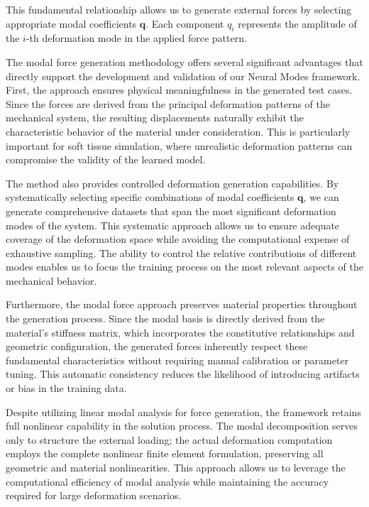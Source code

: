 This fundamental relationship allows us to generate external forces by selecting appropriate modal coefficients $\bm{q}$. Each component $q_i$ represents the amplitude of the $i$-th deformation mode in the applied force pattern.


The modal force generation methodology offers several significant advantages that directly support the development and validation of our Neural Modes framework. First, the approach ensures physical meaningfulness in the generated test cases. Since the forces are derived from the principal deformation patterns of the mechanical system, the resulting displacements naturally exhibit the characteristic behavior of the material under consideration. This is particularly important for soft tissue simulation, where unrealistic deformation patterns can compromise the validity of the learned model.

The method also provides controlled deformation generation capabilities. By systematically selecting specific combinations of modal coefficients $\bm{q}$, we can generate comprehensive datasets that span the most significant deformation modes of the system. This systematic approach allows us to ensure adequate coverage of the deformation space while avoiding the computational expense of exhaustive sampling. The ability to control the relative contributions of different modes enables us to focus the training process on the most relevant aspects of the mechanical behavior.

Furthermore, the modal force approach preserves material properties throughout the generation process. Since the modal basis is directly derived from the material's stiffness matrix, which incorporates the constitutive relationships and geometric configuration, the generated forces inherently respect these fundamental characteristics without requiring manual calibration or parameter tuning. This automatic consistency reduces the likelihood of introducing artifacts or bias in the training data.

Despite utilizing linear modal analysis for force generation, the framework retains full nonlinear capability in the solution process. The modal decomposition serves only to structure the external loading; the actual deformation computation employs the complete nonlinear finite element formulation, preserving all geometric and material nonlinearities. This approach allows us to leverage the computational efficiency of modal analysis while maintaining the accuracy required for large deformation scenarios.

